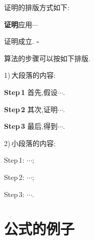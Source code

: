 \documentclass{ctacn}%
\begin{document}
\begin{multicols}{2}









证明的排版方式如下:

\textbf{证明}\quad 应用$\cdots$

证明成立. {\Large$\square$}

算法的步骤可以按如下排版.

1)\,大段落的内容:

\textbf{Step\,1}\quad
首先,假设$\cdots$.

\textbf{Step\,2}\quad
其次,证明$\cdots$.

\textbf{Step\,3}\quad
最后,得到$\cdots$.

2)\,小段落的内容:

Step\,1: $\cdots$;

Step\,2: $\cdots$;

Step\,3: $\cdots$.


\section{公式的例子}

\end{multicols}
\end{document}
